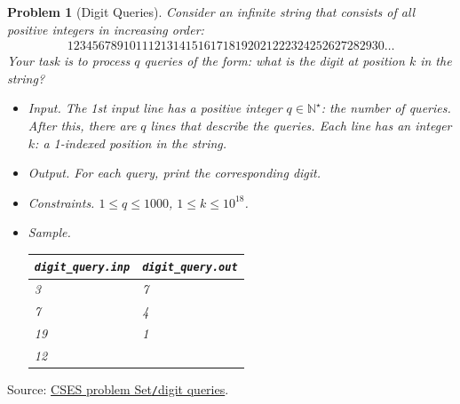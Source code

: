 \documentclass{article}
\newtheorem{problem}{Problem}
\begin{document}
\begin{problem}[Digit Queries]
	Consider an infinite string that consists of all positive integers in increasing order:
	\begin{align*}
		123456789101112131415161718192021222324252627282930\ldots
	\end{align*}
	Your task is to process $q$ queries of the form: what is the digit at position $k$ in the string?
	\begin{itemize}
		\item {\sf Input.} The 1st input line has a positive integer $q\in\mathbb{N}^\star$: the number of queries. After this, there are $q$ lines that describe the queries. Each line has an integer $k$: a 1-indexed position in the string.
		\item {\sf Output.} For each query, print the corresponding digit.
		\item {\sf Constraints.} $1\le q\le1000$, $1\le k\le10^{18}$.
		\item {\sf Sample.}
		\begin{table}[H]
			\centering
			\begin{tabular}{|l|l|}
				\hline
				\verb|digit_query.inp| & \verb|digit_query.out| \\
				\hline
				3 & 7 \\
				7 & 4 \\
				19 & 1 \\
				12 & \\
				\hline
			\end{tabular}
		\end{table}
	\end{itemize}
\end{problem}
Source: \href{https://cses.fi/problemset/task/2431}{CSES problem Set{\tt/}digit queries}.
\end{document}
